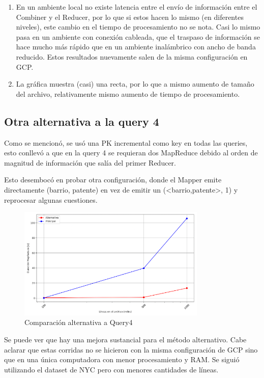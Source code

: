 \documentclass[a4paper,12pt]{article}
\def\FIG#1#2{%
	{\centering#1\par}
	#2}
\begin{document}
	\begin{enumerate}
		\item En un ambiente local no existe latencia entre el envío de información entre el Combiner y el Reducer, por lo que si estos hacen lo mismo (en diferentes niveles), este cambio en el tiempo de procesamiento no se nota. Casi lo mismo pasa en un ambiente con conexión cableada, que el traspaso de información se hace mucho más rápido que en un ambiente inalámbrico con ancho de banda reducido. Estos resultados nuevamente salen de la misma configuración en GCP.
		
		\item La gráfica muestra (casi) una recta, por lo que a mismo aumento de tamaño del archivo, relativamente mismo aumento de tiempo de procesamiento.
	\end{enumerate}
	
	\subsection{Otra alternativa a la query 4}
	
	Como se mencionó, se usó una PK incremental como key en todas las queries, esto conllevó a que en la query 4 se requieran dos MapReduce debido al orden de magnitud de información que salía del primer Reducer.
	
	Esto desembocó en probar otra configuración, donde el Mapper emite directamente (barrio, patente) en vez de emitir un (<barrio,patente>, 1) y reprocesar algunas cuestiones. 
	
	\begin{figure}[h!]%
		\FIG{\includegraphics[width=0.8\textwidth]{./query4_alternative.png}}
		{\caption{Comparación alternativa a Query4}
			\label{fig3}}
	\end{figure}

	Se puede ver que hay una mejora sustancial para el método alternativo. Cabe aclarar que estas corridas no se hicieron con la misma configuración de GCP sino que en una única computadora con menor procesamiento y RAM. Se siguió utilizando el dataset de NYC pero con menores cantidades de líneas.
\end{document}
